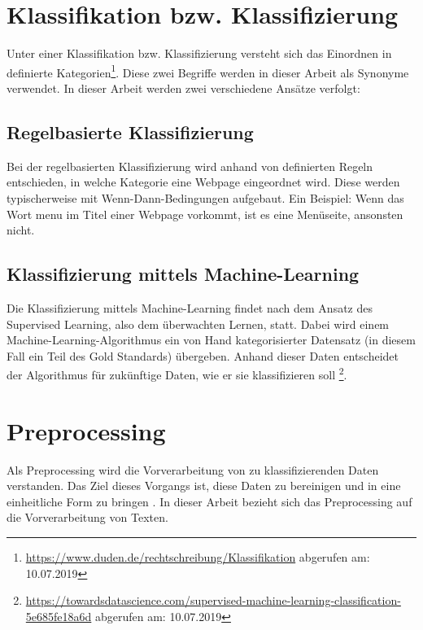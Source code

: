 \section{Klassifikation bzw. Klassifizierung}
Unter einer Klassifikation bzw. Klassifizierung versteht sich das Einordnen in definierte Kategorien\footnote{\url{https://www.duden.de/rechtschreibung/Klassifikation} abgerufen am: 10.07.2019}.
Diese zwei Begriffe werden in dieser Arbeit als Synonyme verwendet.
In dieser Arbeit werden zwei verschiedene Ansätze verfolgt:
\subsection{Regelbasierte Klassifizierung}
Bei der regelbasierten Klassifizierung wird anhand von definierten Regeln entschieden, in welche Kategorie eine Webpage eingeordnet wird.
Diese werden typischerweise mit \glqq Wenn-Dann\grqq-Bedingungen aufgebaut.
Ein Beispiel: Wenn das Wort \glqq menu\grqq{} im Titel einer Webpage vorkommt, ist es eine Menüseite, ansonsten nicht.
\subsection{Klassifizierung mittels Machine-Learning}
Die Klassifizierung mittels Machine-Learning findet nach dem Ansatz des \glqq Supervised Learning\grqq{}, also dem überwachten Lernen, statt.
Dabei wird einem Machine-Learning-Algorithmus ein von Hand kategorisierter Datensatz (in diesem Fall ein Teil des Gold Standards) übergeben.
Anhand dieser Daten entscheidet der Algorithmus für zukünftige Daten, wie er sie klassifizieren soll \footnote{\url{https://towardsdatascience.com/supervised-machine-learning-classification-5e685fe18a6d} abgerufen am: 10.07.2019}.
\section{Preprocessing}
Als Preprocessing wird die Vorverarbeitung von zu klassifizierenden Daten verstanden.
Das Ziel dieses Vorgangs ist, diese Daten zu bereinigen und in eine einheitliche Form zu bringen \cite[p.155]{liu2007web}.
In dieser Arbeit bezieht sich das Preprocessing auf die Vorverarbeitung von Texten.

% 
